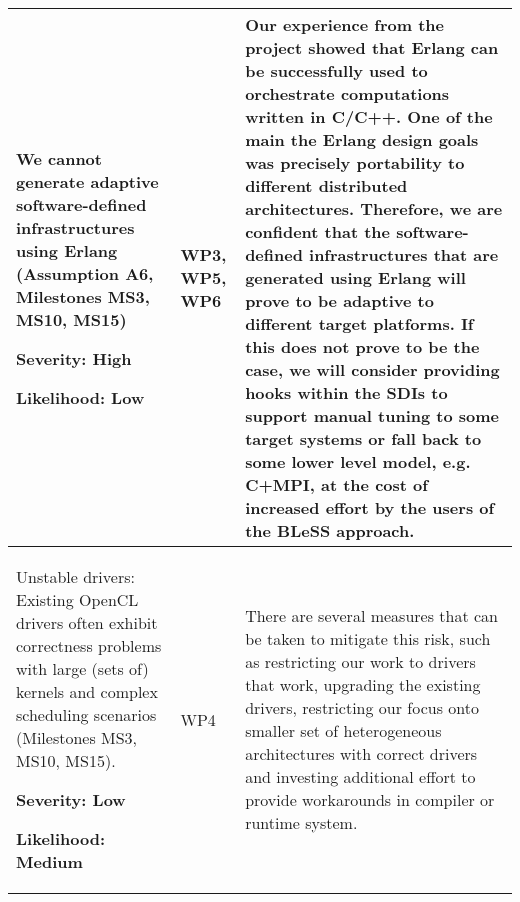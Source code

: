 \documentclass[a4paper,11pt]{article}
\newcommand{\project}[1]{\textbf{#1}\xspace}
\newcommand{\BLESS}{\project{BLeSS}}
\newcommand{\TheProject}{\BLESS}
\begin{document}
\begin{longtable}{| p{3.5cm} | p{1.5cm} | p{11.8cm}  |}
\\ \hline
We cannot generate adaptive software-defined infrastructures using Erlang (Assumption A6, Milestones MS3, MS10, MS15)
\par\vspace{1ex}
\textbf{Severity: High}
\par
\textbf{Likelihood: Low} &
 WP3, WP5, WP6  &
 Our experience from the \paraphrase{} project showed that Erlang can be successfully
 used to orchestrate computations written in C/C++. One of the main the Erlang design goals  was precisely
 portability to different distributed architectures. Therefore, we are confident that the software-defined
 infrastructures that are generated using Erlang will prove to be adaptive to different target platforms. If this does
 not prove to be the case, we will consider providing hooks within the SDIs to support manual tuning to some target
 systems or fall back to some lower level model, e.g. C+MPI, at the cost of increased effort by the users of the \TheProject{} approach. 
 
\\\hline
Unstable drivers: Existing OpenCL drivers often exhibit correctness problems with large (sets of) kernels and complex scheduling scenarios (Milestones MS3, MS10, MS15). 
\par\vspace{1ex}
\textbf{Severity: Low}
\par
\textbf{Likelihood: Medium}&
WP4 & There are several measures that can be taken to mitigate this risk, such as restricting our work to drivers that work, upgrading the existing drivers, restricting our focus onto smaller set of heterogeneous architectures with correct drivers and investing additional effort to provide workarounds in compiler or runtime system.



\end{longtable}
\end{document}
